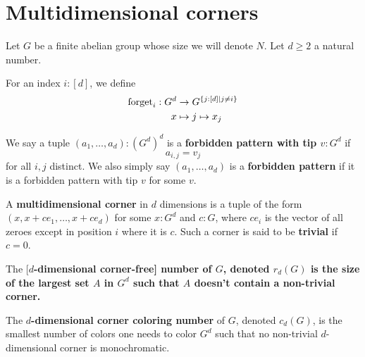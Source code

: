 \chapter{Multidimensional corners}

Let $G$ be a finite abelian group whose size we will denote $N$. Let $d \ge 2$ a natural number.

\begin{definition}
  \label{def:forget}
  \uses{}
  \leanok

  For an index $i : [d]$, we define
  \begin{align}
    \operatorname{forget}_i : G^d & \to G^{\{j : [d] \mid j \ne i\}} \\
    x & \mapsto j \mapsto x_j
  \end{align}
\end{definition}

\begin{definition}
  \label{def:forbidden-pattern}
  \uses{}
  \leanok

  We say a tuple $(a_1, \dots, a_d) : (G^d)^d$ is a {\bf forbidden pattern with tip $v : G^d$} if
  $$a_{i, j} = v_j$$
  for all $i, j$ distinct. We also simply say $(a_1, \dots, a_d)$ is a {\bf forbidden pattern} if it is a forbidden pattern with tip $v$ for some $v$.
\end{definition}

\begin{definition}
  \label{def:multicorner}
  \uses{}
  \leanok

  A {\bf multidimensional corner} in $d$ dimensions is a tuple of the form $(x, x + ce_1, \dots, x + ce_d)$ for some $x : G^d$ and $c : G$, where $ce_i$ is the vector of all zeroes except in position $i$ where it is $c$. Such a corner is said to be {\bf trivial} if $c = 0$.
\end{definition}

\begin{definition}
  \label{def:corner-free-num}

  The [\bf $d$-dimensional corner-free] number of $G$, denoted $r_d(G)$ is the size of the largest set $A$ in $G^d$ such that $A$ doesn't contain a non-trivial corner.
\end{definition}

\begin{definition}
  \label{def:corner-color-num}

  The {\bf $d$-dimensional corner coloring number} of $G$, denoted $c_d(G)$, is the smallest number of colors one needs to color $G^d$ such that no non-trivial $d$-dimensional corner is monochromatic.
\end{definition}

